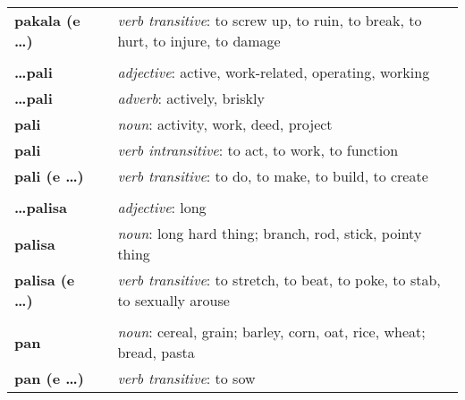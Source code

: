 \begin{supertabular}{p{2,5cm}|ll}
    \textbf{pakala (e \dots)}    &  & \textit{verb transitive}: to screw up, to ruin, to break, to hurt, to injure, to damage                    \\
                                 &  &                                                                                                            \\
    \textbf{\dots pali}          &  & \textit{adjective}: active, work-related, operating, working                                               \\
    \textbf{\dots pali}          &  & \textit{adverb}: actively, briskly                                                                         \\
    \textbf{pali}                &  & \textit{noun}: activity, work, deed, project                                                               \\
    \textbf{pali}                &  & \textit{verb intransitive}: to act, to work, to function                                                   \\
    \textbf{pali (e \dots)}      &  & \textit{verb transitive}: to do, to make, to build, to create                                              \\
                                 &  &                                                                                                            \\
    \textbf{\dots palisa}        &  & \textit{adjective}: long                                                                                   \\
    \textbf{palisa}              &  & \textit{noun}: long hard thing; branch, rod, stick, pointy thing                                           \\
    \textbf{palisa (e \dots)}    &  & \textit{verb transitive}: to stretch, to beat, to poke, to stab, to sexually arouse                        \\
                                 &  &                                                                                                            \\
    \textbf{pan}                 &  & \textit{noun}: cereal, grain; barley, corn, oat, rice, wheat; bread, pasta                                 \\
    \textbf{pan (e \dots)}       &  & \textit{verb transitive}: to sow                                                                           \\

\end{supertabular}
